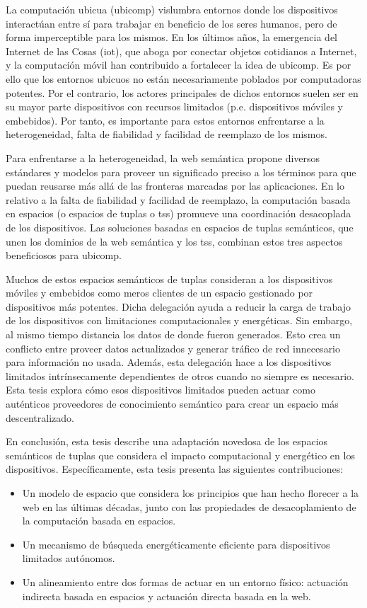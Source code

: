 \begin{resumen}        %
La computación ubicua (\acs{ubicomp}) vislumbra entornos donde los dispositivos interactúan entre sí para trabajar en beneficio de los seres humanos, pero de forma imperceptible para los mismos.
En los últimos años, la emergencia del Internet de las Cosas (\acs{iot}), que aboga por conectar objetos cotidianos a Internet, y la computación móvil han contribuido a fortalecer la idea de \ac{ubicomp}.
Es por ello que los entornos ubicuos no están necesariamente poblados por computadoras potentes.
Por el contrario, los actores principales de dichos entornos suelen ser en su mayor parte dispositivos con recursos limitados (p.e. dispositivos móviles y embebidos).
Por tanto, es importante para estos entornos enfrentarse a la heterogeneidad, falta de fiabilidad y facilidad de reemplazo de los mismos.


Para enfrentarse a la heterogeneidad, la web semántica propone diversos estándares y modelos para proveer un significado preciso a los términos para que puedan reusarse más allá de las fronteras marcadas por las aplicaciones.
En lo relativo a la falta de fiabilidad y facilidad de reemplazo, la computación basada en espacios (o espacios de tuplas o \aclp{ts}) promueve una coordinación desacoplada de los dispositivos.
Las soluciones basadas en espacios de tuplas semánticos, que unen los dominios de la web semántica y los \aclp{ts}, combinan estos tres aspectos beneficiosos para \ac{ubicomp}.


Muchos de estos espacios semánticos de tuplas consideran a los dispositivos móviles y embebidos como meros clientes de un espacio gestionado por dispositivos más potentes.
Dicha delegación ayuda a reducir la carga de trabajo de los dispositivos con limitaciones computacionales y energéticas.
Sin embargo, al mismo tiempo distancia los datos de donde fueron generados.
Esto crea un conflicto entre proveer datos actualizados y generar tráfico de red innecesario para información no usada.
Además, esta delegación hace a los dispositivos limitados intrínsecamente dependientes de otros cuando no siempre es necesario.
Esta tesis explora cómo esos dispositivos limitados pueden actuar como auténticos proveedores de conocimiento semántico para crear un espacio más descentralizado.


En conclusión, esta tesis describe una adaptación novedosa de los espacios semánticos de tuplas que considera el impacto computacional y energético en los dispositivos.
Específicamente, esta tesis presenta las siguientes contribuciones:
\begin{itemize}
  \item Un modelo de espacio que considera los principios que han hecho florecer a la web en las últimas décadas, junto con las propiedades de desacoplamiento de la computación basada en espacios.
  \item Un mecanismo de búsqueda energéticamente eficiente para dispositivos limitados autónomos.
  \item Un alineamiento entre dos formas de actuar en un entorno físico: actuación indirecta basada en espacios y actuación directa basada en la web.
\end{itemize}


\end{resumen}
